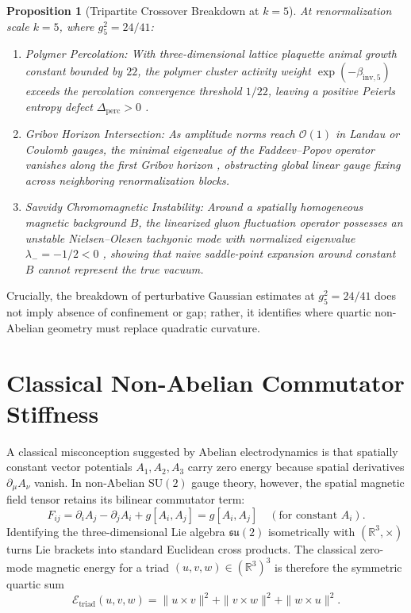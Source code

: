 \documentclass[11pt,a4paper]{article}
\newtheorem{proposition}[theorem]{Proposition}
\newcommand{\R}{\mathbb{R}}
\newcommand{\SU}{\mathrm{SU}}
\begin{document}
\begin{proposition}[Tripartite Crossover Breakdown at $k = 5$]
At renormalization scale $k = 5$, where $g_5^2 = 24/41$:
\begin{enumerate}
\item \emph{Polymer Percolation:} With three-dimensional lattice plaquette animal growth constant bounded by $22$, the polymer cluster activity weight $\exp(-\beta_{\mathrm{inv}, 5})$ exceeds the percolation convergence threshold $1/22$, leaving a positive Peierls entropy defect $\Delta_{\mathrm{perc}} > 0$ \cite{Peierls1936}.
\item \emph{Gribov Horizon Intersection:} As amplitude norms reach $\mathcal{O}(1)$ in Landau or Coulomb gauges, the minimal eigenvalue of the Faddeev--Popov operator vanishes along the first Gribov horizon \cite{Gribov1978,Zwanziger1989}, obstructing global linear gauge fixing across neighboring renormalization blocks.
\item \emph{Savvidy Chromomagnetic Instability:} Around a spatially homogeneous magnetic background $B$, the linearized gluon fluctuation operator possesses an unstable Nielsen--Olesen tachyonic mode with normalized eigenvalue $\lambda_- = -1/2 < 0$ \cite{Savvidy1977,NielsenOlesen1978}, showing that naive saddle-point expansion around constant $B$ cannot represent the true vacuum.
\end{enumerate}
\end{proposition}

Crucially, the breakdown of perturbative Gaussian estimates at $g_5^2 = 24/41$ does not imply absence of confinement or gap; rather, it identifies where quartic non-Abelian geometry must replace quadratic curvature.

\section{Classical Non-Abelian Commutator Stiffness}
A classical misconception suggested by Abelian electrodynamics is that spatially constant vector potentials $A_1, A_2, A_3$ carry zero energy because spatial derivatives $\partial_\mu A_\nu$ vanish. In non-Abelian $\SU(2)$ gauge theory, however, the spatial magnetic field tensor retains its bilinear commutator term:
\begin{equation}
F_{ij} = \partial_i A_j - \partial_j A_i + g [A_i, A_j] = g [A_i, A_j] \quad (\text{for constant } A_i).
\end{equation}
Identifying the three-dimensional Lie algebra $\mathfrak{su}(2)$ isometrically with $(\R^3, \times)$ turns Lie brackets into standard Euclidean cross products. The classical zero-mode magnetic energy for a triad $(u, v, w) \in (\R^3)^3$ is therefore the symmetric quartic sum
\begin{equation}
\mathcal{E}_{\mathrm{triad}}(u, v, w) = \|u \times v\|^2 + \|v \times w\|^2 + \|w \times u\|^2.
\end{equation}
\end{document}
